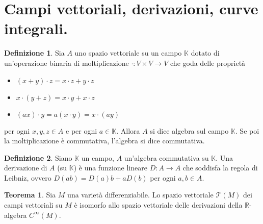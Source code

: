 \documentclass[a4paper,11pt]{article}
\theoremstyle{definition}
\newtheorem{definizione}{Definizione}[section]
\theoremstyle{theorem}
\newtheorem{teorema}{Teorema}[section]
\begin{document}
\section{Campi vettoriali, derivazioni, curve integrali.}
\begin{definizione}
	Sia $A$ uno spazio vettoriale su un campo $\mathbb{K}$ dotato di un'operazione binaria di moltiplicazione $\cdot\colon V\times V\to V$ che goda delle proprietà
	\begin{itemize}
		\item $(x+y)\cdot z=x\cdot z+y\cdot z$
		\item $x\cdot(y+z)=x\cdot y+x\cdot z$
		\item $(ax)\cdot y=a(x\cdot y)=x\cdot(ay)$
	\end{itemize}
	per ogni $x,y,z\in A$ e per ogni $a\in\mathbb{K}$. Allora $A$ si dice algebra sul campo $\mathbb{K}$. Se poi la moltiplicazione è commutativa, l'algebra si dice commutativa.
\end{definizione}
\begin{definizione}
	Siano $\mathbb{K}$ un campo, $A$ un'algebra commutativa su $\mathbb{K}$. Una derivazione di $A$ (su $\mathbb{K}$) è una funzione lineare $D\colon A\to A$ che soddisfa la regola di Leibniz, ovvero $D(ab)=D(a)b+aD(b)$ per ogni $a,b\in A$.
\end{definizione}
\begin{teorema}
	Sia $M$ una varietà differenziabile. Lo spazio vettoriale $\mathcal{T}(M)$ dei campi vettoriali su $M$ è isomorfo allo spazio vettoriale delle derivazioni della $\mathbb{R}$-algebra $C^\infty(M)$.
\end{teorema}
\end{document}
